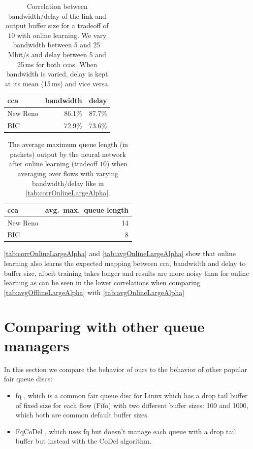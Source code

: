 \documentclass[conference]{IEEEtran}
\begin{document}
\begin{table}[h]
\caption{Correlation between bandwidth/delay of the link and output buffer size for a tradeoff of $10$ with online learning. We vary bandwidth between 5 and 25\,Mbit/s and delay between 5 and 25\,ms for both \glspl{cca}. When bandwidth is varied, delay is kept at its mean (15\,ms) and vice versa.} \label{tab:corrOnlineLargeAlpha}
\centering
\begin{tabular}{lrr} \toprule
\gls{cca} & bandwidth & delay \\ \midrule
New Reno & 86.1\% & 87.7\% \\
BIC & 72.9\% & 73.6\% \\
\bottomrule
\end{tabular}
\end{table}

\begin{table}[h]
\caption{The average maximum queue length (in packets) output by the neural network after online learning (tradeoff $10$) when averaging over flows with varying bandwidth/delay like in \autoref{tab:corrOnlineLargeAlpha}.} \label{tab:avgOnlineLargeAlpha}
\centering
\begin{tabular}{lr} \toprule
\gls{cca} & avg.~max.~queue length \\ \midrule
New Reno & 14 \\
BIC & 8 \\
\bottomrule
\end{tabular}
\end{table}

\autoref{tab:corrOnlineLargeAlpha} and \autoref{tab:avgOnlineLargeAlpha} show that online learning also learns the expected mapping between \gls{cca}, bandwidth and delay to buffer size, albeit training takes longer and results are more noisy than for online learning as can be seen in the lower correlations when comparing \autoref{tab:avgOfflineLargeAlpha} with \autoref{tab:avgOnlineLargeAlpha}

\section{Comparing with other queue managers}

In this section we compare the behavior of \gls{ours} to the behavior of other popular fair queue discs: \begin{itemize}
\item fq \cite{dumazet_pkt_sched:_2013}, which is a common fair queue disc for Linux which has a drop tail buffer of fixed size for each flow (Fifo) with two different buffer sizes: 100 and 1000, which both are common default buffer sizes. 
\item FqCoDel \cite{taht_flow_2018}, which uses fq but doesn't manage each queue with a drop tail buffer but instead with the CoDel algorithm. 
\end{itemize}
\end{document}
